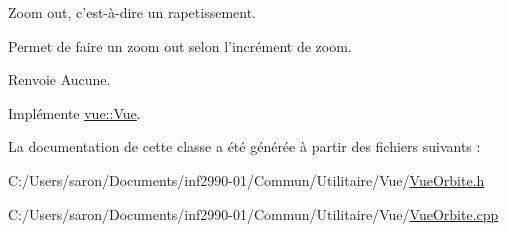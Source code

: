 Zoom out, c'est-\/à-\/dire un rapetissement. 

Permet de faire un zoom out selon l'incrément de zoom.

\begin{DoxyReturn}{Renvoie}
Aucune. 
\end{DoxyReturn}


Implémente \hyperlink{classvue_1_1_vue_a90d184491ccfb6a93839a2e9bd48bac1}{vue\-::\-Vue}.



La documentation de cette classe a été générée à partir des fichiers suivants \-:\begin{DoxyCompactItemize}
\item 
C\-:/\-Users/saron/\-Documents/inf2990-\/01/\-Commun/\-Utilitaire/\-Vue/\hyperlink{_vue_orbite_8h}{Vue\-Orbite.\-h}\item 
C\-:/\-Users/saron/\-Documents/inf2990-\/01/\-Commun/\-Utilitaire/\-Vue/\hyperlink{_vue_orbite_8cpp}{Vue\-Orbite.\-cpp}\end{DoxyCompactItemize}
